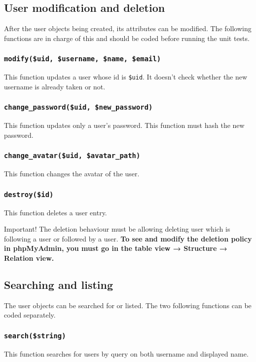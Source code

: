 \documentclass[twoside,a4paper,12pt]{article}
\begin{document}
\subsection{User modification and deletion}
After the user objects being created, its attributes can be modified. The following functions are in charge of this and should be coded before running the unit tests.

\subsubsection{\texttt{modify(\$uid, \$username, \$name, \$email)}}
This function updates a user whose id is \texttt{\$uid}. It doesn't check whether the new username is already taken or not.


\subsubsection{\texttt{change\_password(\$uid, \$new\_password)}}
This function updates only a user's password. This function must hash the new password.

\subsubsection{\texttt{change\_avatar(\$uid, \$avatar\_path)}}
This function changes the avatar of the user.

\subsubsection{\texttt{destroy(\$id)}}
This function deletes a user entry.

\begin{bclogo}[logo=\bcattention, noborder=true, barre=none]{Important!}
	The deletion behaviour must be allowing deleting user which is following a user or followed by a user. \textbf{To see and modify the deletion policy in phpMyAdmin, you must go in the table view → Structure → Relation view.}
		
\end{bclogo}

\subsection{Searching and listing}
The user objects can be searched for or listed. The two following functions can be coded separately.

\subsubsection{\texttt{search(\$string)}}
This function searches for users by query on both username and displayed name.
\end{document}
